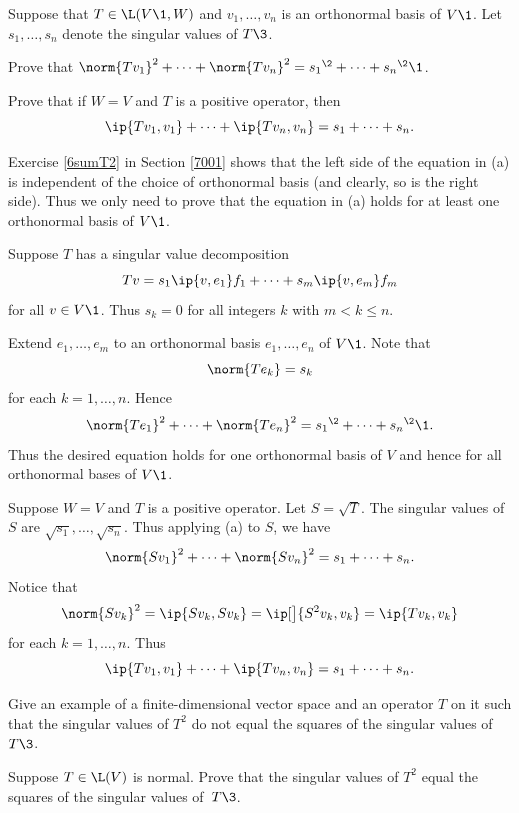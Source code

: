 \exercise
Suppose that $T \in \L(V\1, W)$ and $v_1, \ldots, v_n$ is an orthonormal basis of $V\1$. Let $s_1, \ldots, s_n$ denote the singular values of $T\3$.\label{7sums2}
\begin{subtheorem}
\item
Prove that
$\norm{Tv_1}^2 + \cdots + \norm{Tv_n}^2 = {s_1}^{\2} + \cdots + {s_n}^{\2}\1$.
\item
Prove that if $W = V$ and $T$ is a positive operator, then
\[
\ip{Tv_1, v_1} + \cdots + \ip{Tv_n, v_n} = s_1 + \cdots + s_n.
\]
\exercisedisplayend
\end{subtheorem}

\begin{Solution}
\begin{subtheorem}
\item
Exercise \ref{6sumT2} in Section \ref{7001} shows that the left side of the equation in (a) is independent of the choice of orthonormal basis (and clearly, so is the right side). Thus we only need to prove that the equation in (a) holds for at least one orthonormal basis of $V\1$.

Suppose $T$ has a singular value decomposition
\[
Tv = s_1 \ip{v, e_1} f_1 + \cdots + s_m \ip{v, e_m} f_m
\]
for all $v \in V\1$. Thus $s_k = 0$ for all integers $k$ with $m < k \le n$.

Extend $e_1, \ldots, e_m$ to an orthonormal basis $e_1, \ldots, e_n$ of $V\1$. Note that
\[
\norm{Te_k} = s_k
\]
for each $k = 1, \ldots, n$. Hence
\[
\norm{Te_1}^2 + \cdots + \norm{Te_n}^2 = {s_1}^{\2} + \cdots + {s_n}^{\2}\1.
\]
Thus the desired equation holds for one orthonormal basis of $V$ and hence for all orthonormal bases of $V\1$.

\item
Suppose $W = V$ and $T$ is a positive operator. Let $S = \sqrt{T}$. The singular values of $S$ are
$\sqrt{s_1}, \ldots, \sqrt{s_n}$. Thus applying (a) to $S$, we have
\[
\norm{Sv_1}^2 + \cdots + \norm{Sv_n}^2 = s_1 + \cdots + s_n.
\]
Notice that
\[
\norm{Sv_k}^2 = \ip{Sv_k, Sv_k} = \ip[\big]{ S^2 v_k, v_k} = \ip{Tv_k, v_k}
\]
for each $k = 1, \ldots, n$. Thus
\[
\ip{Tv_1, v_1} + \cdots + \ip{Tv_n, v_n} = s_1 + \cdots + s_n.
\]
\end{subtheorem}
\end{Solution}

\exercise
\begin{SUBtheorem}
\item
Give an example of a finite-dimensional vector space and an operator $T$ on it
such that the singular values of $T^2$ do not equal the squares of the singular values of~$T\3$.
\item
Suppose $T \in \L(V)$ is normal. Prove that the singular values of $T^2$ equal the squares of the singular values of~$T\3$.
\end{SUBtheorem}

